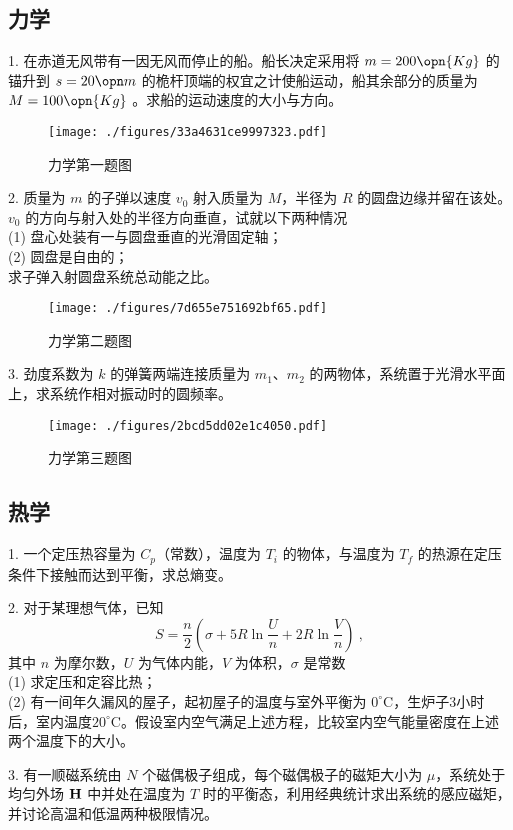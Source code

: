 \subsection{力学}
1. 在赤道无风带有一因无风而停止的船。船长决定采用将 $m=200\opn{Kg}$ 的锚升到 $s=20\opn m$ 的桅杆顶端的权宜之计使船运动，船其余部分的质量为 $M=100 \opn{Kg}$ 。求船的运动速度的大小与方向。
\begin{figure}[ht]
\centering
\texttt{[image: ./figures/33a4631ce9997323.pdf]}
\caption{力学第一题图} \label{fig_NJU12_1}
\end{figure}
2. 质量为 $m$ 的子弹以速度 $v_0$ 射入质量为 $M$，半径为 $R$ 的圆盘边缘并留在该处。$v_0$ 的方向与射入处的半径方向垂直，试就以下两种情况\\
(1) 盘心处装有一与圆盘垂直的光滑固定轴；\\
(2) 圆盘是自由的；\\
求子弹入射圆盘系统总动能之比。
\begin{figure}[ht]
\centering
\texttt{[image: ./figures/7d655e751692bf65.pdf]}
\caption{力学第二题图} \label{fig_NJU12_2}
\end{figure}
3. 劲度系数为 $k$ 的弹簧两端连接质量为 $m_1$、$m_2$ 的两物体，系统置于光滑水平面上，求系统作相对振动时的圆频率。
\begin{figure}[ht]
\centering
\texttt{[image: ./figures/2bcd5dd02e1c4050.pdf]}
\caption{力学第三题图} \label{fig_NJU12_3}
\end{figure}
\subsection{热学}
1. 一个定压热容量为 $C_p$（常数），温度为 $T_i$ 的物体，与温度为 $T_f$ 的热源在定压条件下接触而达到平衡，求总熵变。

2. 对于某理想气体，已知
\begin{equation}
S=\frac n2 (\sigma+5R\ln{\frac Un}+2R\ln{\frac Vn})~,
\end{equation}
其中 $n$ 为摩尔数，$U$ 为气体内能，$V$ 为体积，$\sigma$ 是常数\\
(1) 求定压和定容比热；\\
(2) 有一间年久漏风的屋子，起初屋子的温度与室外平衡为 $0^\circ\mathrm{C}$，生炉子3小时后，室内温度$20^\circ\mathrm{C}$。假设室内空气满足上述方程，比较室内空气能量密度在上述两个温度下的大小。

3. 有一顺磁系统由 $N$ 个磁偶极子组成，每个磁偶极子的磁矩大小为 $\mu$，系统处于均匀外场 $\bf H$ 中并处在温度为 $T$ 时的平衡态，利用经典统计求出系统的感应磁矩，并讨论高温和低温两种极限情况。
